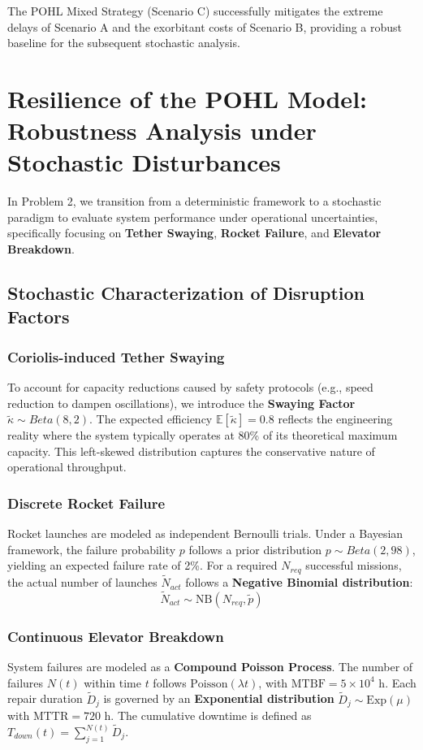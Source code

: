 \documentclass{mcmthesis}
\begin{document}
	The POHL Mixed Strategy (Scenario C) successfully mitigates the extreme delays of Scenario A and the exorbitant costs of Scenario B, providing a robust baseline for the subsequent stochastic analysis.\\
	\section{Resilience of the POHL Model: Robustness Analysis under Stochastic Disturbances}
In Problem 2, we transition from a deterministic framework to a stochastic paradigm to evaluate system performance under operational uncertainties, specifically focusing on \textbf{Tether Swaying}, \textbf{Rocket Failure}, and \textbf{Elevator Breakdown}.
\subsection{Stochastic Characterization of Disruption Factors}

\subsubsection{Coriolis-induced Tether Swaying}
To account for capacity reductions caused by safety protocols (e.g., speed reduction to dampen oscillations), we introduce the \textbf{Swaying Factor} $\tilde{\kappa} \sim Beta(8, 2)$. 
The expected efficiency $\mathbb{E}[\tilde{\kappa}] = 0.8$ reflects the engineering reality where the system typically operates at 80\% of its theoretical maximum capacity. This left-skewed distribution captures the conservative nature of operational throughput.

\subsubsection{Discrete Rocket Failure}
Rocket launches are modeled as independent Bernoulli trials. Under a Bayesian framework, the failure probability $p$ follows a prior distribution $p \sim Beta(2, 98)$, yielding an expected failure rate of 2\%. For a required $N_{req}$ successful missions, the actual number of launches $\tilde{N}_{act}$ follows a \textbf{Negative Binomial distribution}:
\begin{equation}
	\tilde{N}_{act} \sim \mathrm{NB}(N_{req}, \tilde{p})
\end{equation}

\subsubsection{Continuous Elevator Breakdown}
System failures are modeled as a \textbf{Compound Poisson Process}. The number of failures $N(t)$ within time $t$ follows $\mathrm{Poisson}(\lambda t)$, with $\text{MTBF} = 5 \times 10^4$ h. Each repair duration $\tilde{D}_j$ is governed by an \textbf{Exponential distribution} $\tilde{D}_j \sim \mathrm{Exp}(\mu)$ with $\text{MTTR} = 720$ h. The cumulative downtime is defined as $T_{down}(t) = \sum_{j=1}^{N(t)} \tilde{D}_j$.
\end{document}
